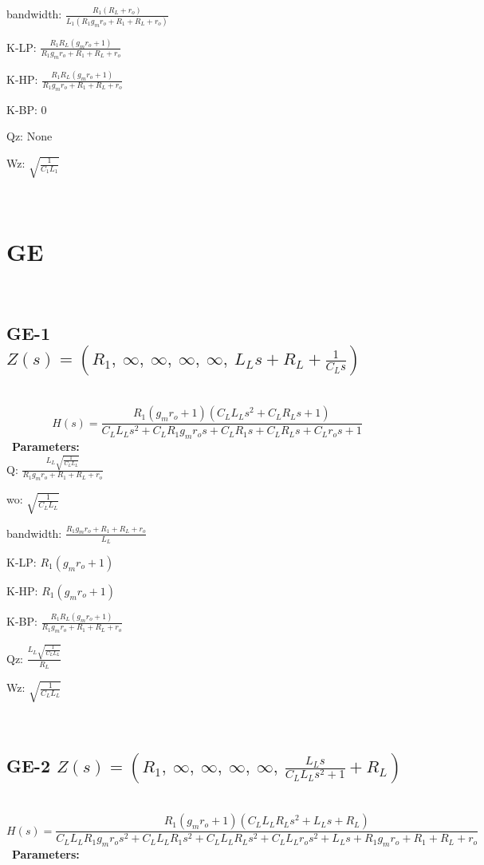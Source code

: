 \documentclass{article}
\begin{document}
bandwidth: $\frac{R_{1} \left(R_{L} + r_{o}\right)}{L_{1} \left(R_{1} g_{m} r_{o} + R_{1} + R_{L} + r_{o}\right)}$\ 

K-LP: $\frac{R_{1} R_{L} \left(g_{m} r_{o} + 1\right)}{R_{1} g_{m} r_{o} + R_{1} + R_{L} + r_{o}}$\ 

K-HP: $\frac{R_{1} R_{L} \left(g_{m} r_{o} + 1\right)}{R_{1} g_{m} r_{o} + R_{1} + R_{L} + r_{o}}$\ 

K-BP: $0$\ 

Qz: $\text{None}$\ 

Wz: $\sqrt{\frac{1}{C_{1} L_{1}}}$\ 

\ 

\section{GE}\ 
\subsection{GE-1 $Z(s) = \left( R_{1}, \  \infty, \  \infty, \  \infty, \  \infty, \  L_{L} s + R_{L} + \frac{1}{C_{L} s}\right)$ } \ 
\textbf{\[H(s) = \frac{R_{1} \left(g_{m} r_{o} + 1\right) \left(C_{L} L_{L} s^{2} + C_{L} R_{L} s + 1\right)}{C_{L} L_{L} s^{2} + C_{L} R_{1} g_{m} r_{o} s + C_{L} R_{1} s + C_{L} R_{L} s + C_{L} r_{o} s + 1}\] } \ 
\textbf{Parameters:}\\ 

Q: $\frac{L_{L} \sqrt{\frac{1}{C_{L} L_{L}}}}{R_{1} g_{m} r_{o} + R_{1} + R_{L} + r_{o}}$\ 

wo: $\sqrt{\frac{1}{C_{L} L_{L}}}$\ 

bandwidth: $\frac{R_{1} g_{m} r_{o} + R_{1} + R_{L} + r_{o}}{L_{L}}$\ 

K-LP: $R_{1} \left(g_{m} r_{o} + 1\right)$\ 

K-HP: $R_{1} \left(g_{m} r_{o} + 1\right)$\ 

K-BP: $\frac{R_{1} R_{L} \left(g_{m} r_{o} + 1\right)}{R_{1} g_{m} r_{o} + R_{1} + R_{L} + r_{o}}$\ 

Qz: $\frac{L_{L} \sqrt{\frac{1}{C_{L} L_{L}}}}{R_{L}}$\ 

Wz: $\sqrt{\frac{1}{C_{L} L_{L}}}$\ 

\ 

\subsection{GE-2 $Z(s) = \left( R_{1}, \  \infty, \  \infty, \  \infty, \  \infty, \  \frac{L_{L} s}{C_{L} L_{L} s^{2} + 1} + R_{L}\right)$ } \ 
\textbf{\[H(s) = \frac{R_{1} \left(g_{m} r_{o} + 1\right) \left(C_{L} L_{L} R_{L} s^{2} + L_{L} s + R_{L}\right)}{C_{L} L_{L} R_{1} g_{m} r_{o} s^{2} + C_{L} L_{L} R_{1} s^{2} + C_{L} L_{L} R_{L} s^{2} + C_{L} L_{L} r_{o} s^{2} + L_{L} s + R_{1} g_{m} r_{o} + R_{1} + R_{L} + r_{o}}\] } \ 
\textbf{Parameters:}\\ 
\end{document}
